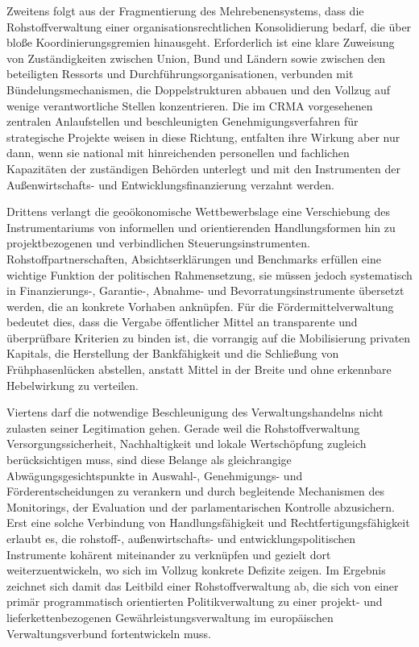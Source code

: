 \documentclass[12pt,a4paper,oneside]{book} %
\begin{document}
{Zweitens folgt aus der Fragmentierung des Mehrebenensystems, dass die Rohstoffverwaltung einer organisationsrechtlichen Konsolidierung bedarf, die über bloße Koordinierungsgremien hinausgeht. Erforderlich ist eine klare Zuweisung von Zuständigkeiten zwischen Union, Bund und Ländern sowie zwischen den beteiligten Ressorts und Durchführungsorganisationen, verbunden mit Bündelungsmechanismen, die Doppelstrukturen abbauen und den Vollzug auf wenige verantwortliche Stellen konzentrieren. Die im CRMA vorgesehenen zentralen Anlaufstellen und beschleunigten Genehmigungsverfahren für strategische Projekte weisen in diese Richtung, entfalten ihre Wirkung aber nur dann, wenn sie national mit hinreichenden personellen und fachlichen Kapazitäten der zuständigen Behörden unterlegt und mit den Instrumenten der Außenwirtschafts- und Entwicklungsfinanzierung verzahnt werden.

Drittens verlangt die geoökonomische Wettbewerbslage eine Verschiebung des Instrumentariums von informellen und orientierenden Handlungsformen hin zu projektbezogenen und verbindlichen Steuerungsinstrumenten. Rohstoffpartnerschaften, Absichtserklärungen und Benchmarks erfüllen eine wichtige Funktion der politischen Rahmensetzung, sie müssen jedoch systematisch in Finanzierungs-, Garantie-, Abnahme- und Bevorratungsinstrumente übersetzt werden, die an konkrete Vorhaben anknüpfen. Für die Fördermittelverwaltung bedeutet dies, dass die Vergabe öffentlicher Mittel an transparente und überprüfbare Kriterien zu binden ist, die vorrangig auf die Mobilisierung privaten Kapitals, die Herstellung der Bankfähigkeit und die Schließung von Frühphasenlücken abstellen, anstatt Mittel in der Breite und ohne erkennbare Hebelwirkung zu verteilen.

Viertens darf die notwendige Beschleunigung des Verwaltungshandelns nicht zulasten seiner Legitimation gehen. Gerade weil die Rohstoffverwaltung Versorgungssicherheit, Nachhaltigkeit und lokale Wertschöpfung zugleich berücksichtigen muss, sind diese Belange als gleichrangige Abwägungsgesichtspunkte in Auswahl-, Genehmigungs- und Förderentscheidungen zu verankern und durch begleitende Mechanismen des Monitorings, der Evaluation und der parlamentarischen Kontrolle abzusichern. Erst eine solche Verbindung von Handlungsfähigkeit und Rechtfertigungsfähigkeit erlaubt es, die rohstoff-, außenwirtschafts- und entwicklungspolitischen Instrumente kohärent miteinander zu verknüpfen und gezielt dort weiterzuentwickeln, wo sich im Vollzug konkrete Defizite zeigen. Im Ergebnis zeichnet sich damit das Leitbild einer Rohstoffverwaltung ab, die sich von einer primär programmatisch orientierten Politikverwaltung zu einer projekt- und lieferkettenbezogenen Gewährleistungsverwaltung im europäischen Verwaltungsverbund fortentwickeln muss.

}
\end{document}
